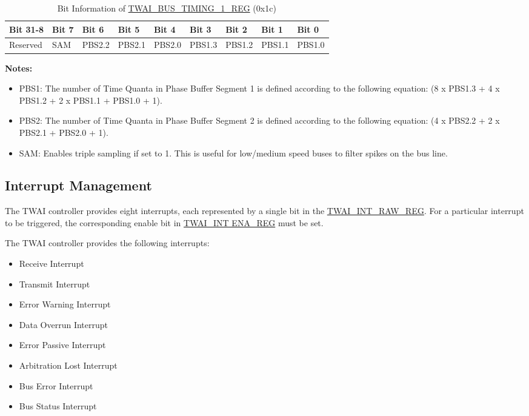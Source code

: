 \documentclass[main\_\_EN.tex]{subfiles}
\begin{document}
\begin{longtable}[c]{|p{1.4cm}|p{1.4cm}|p{1.4cm}|p{1.4cm}|p{1.4cm}|p{1.4cm}|p{1.4cm}|p{1.4cm}|p{1.4cm}|}
    \caption{Bit Information of \hyperref[regdesc:TWAIBUSTIMING1REG]{TWAI\_BUS\_TIMING\_1\_REG} (0x1c)}
    \label{tab:twai-bit-info-bus-timing-1-reg}\\
    \hline
       \rowcolor{lightgray}
   \textbf{Bit 31-8} & \textbf{Bit 7} & \textbf{Bit 6} & \textbf{Bit 5} & \textbf{Bit 4} & \textbf{Bit 3} & \textbf{Bit 2} & \textbf{Bit 1} & \textbf{Bit 0}\\\hline 
   Reserved & SAM & PBS2.2 & PBS2.1 & PBS2.0 & PBS1.3 &PBS1.2 & PBS1.1 & PBS1.0\\
    \hline
\end{longtable}
\vspace{-1.5em}
{\bfseries Notes:}\\
\begin{itemize}
    \item PBS1: The number of Time Quanta in Phase Buffer Segment 1 is defined according to the following equation: (8 x PBS1.3 + 4 x PBS1.2 + 2 x PBS1.1 + PBS1.0 + 1).
    \item PBS2: The number of Time Quanta in Phase Buffer Segment 2 is defined according to the following equation: (4 x PBS2.2 + 2 x PBS2.1 + PBS2.0 + 1).
    \item SAM: Enables triple sampling if set to 1. This is useful for low/medium speed buses to filter spikes on the bus line.
\end{itemize}

\subsection{Interrupt Management}
\label{sec:twai-interrupt-management}
The \chipname{} TWAI controller provides eight interrupts, each represented by a single bit in the \hyperref[regdesc:TWAIINTRAWREG]{TWAI\_INT\_RAW\_REG}. For a particular interrupt to be triggered, the corresponding enable bit in \hyperref[regdesc:TWAIINT ENAREG]{TWAI\_INT ENA\_REG} must be set.

The TWAI controller provides the following interrupts:

\begin{itemize}
    \item Receive Interrupt
    \item Transmit Interrupt
    \item Error Warning Interrupt
    \item Data Overrun Interrupt
    \item Error Passive Interrupt
    \item Arbitration Lost Interrupt
    \item Bus Error Interrupt
    \item Bus Status Interrupt
\end{itemize}
\end{document}
